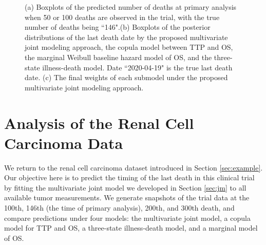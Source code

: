 \begin{figure}
\centering
{}
\hfill
{}
\hfill
{}
\caption{(a) Boxplots of the predicted number of deaths at primary analysis when 50 or 100 deaths are observed in the trial, with the true number of deaths being ``146".(b) Boxplots of the posterior distributions of the last death date by the proposed multivariate joint modeling approach, the copula model between TTP and OS, the marginal Weibull baseline hazard model of OS, and the three-state illness-death model. Date ``2020-04-19" is the true last death date. (c) The final weights of each submodel under the proposed multivariate joint modeling approach.}
\end{figure}

\section{Analysis of the Renal Cell Carcinoma Data}
\label{sec:caseanalysis}
We return to the renal cell carcinoma dataset introduced in Section \ref{sec:example}. Our objective here is to predict the timing of the last death in this clinical trial by fitting the multivariate joint model we developed in Section \ref{sec:jm} to all available tumor measurements. We generate snapshots of the trial data at the 100th, 146th (the time of primary analysis), 200th, and 300th death, and compare predictions under four models: the multivariate joint model, a copula model for \ac{TTP} and OS, a three-state illness-death model, and a marginal model of OS. 

